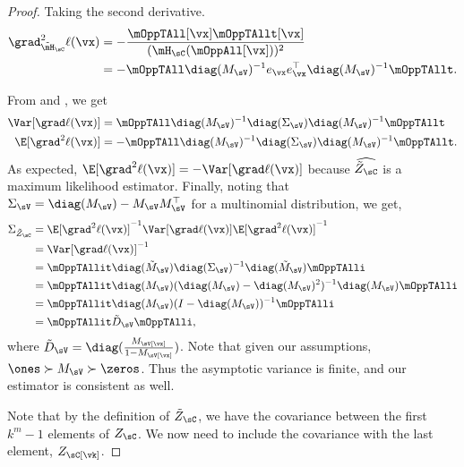 \begin{proof}
Taking the second derivative.
\begin{align}
  \grad^2_{\tilde \mH_\sC} \ell(\vx)
  &= - \frac{\mOppTAll[\vx] \mOppTAllt[\vx]}{(\mH_\sC(\mOppAll[\vx]))^2} \nonumber \\
  &= - \mOppTAll \diag(M_{\sV})^{-1} e_\vx e_\vx^\top  \diag(M_{\sV})^{-1} \mOppTAllt. \label{eqn:lhood-hess}%
\end{align}

From  and , we get
  \begin{align*}
    \Var [\grad \ell(\vx)] &= \mOppTAll \diag(M_\sV)^{-1} \diag(\Sigma_\sV) \diag(M_\sV)^{-1} \mOppTAllt \\
    \E[\grad^2 \ell(\vx)] &= -\mOppTAll \diag(M_\sV)^{-1} \diag(\Sigma_\sV) \diag(M_\sV)^{-1} \mOppTAllt.
  \end{align*}
As expected, $\E[\grad^2 \ell(\vx)] = -\Var [\grad \ell(\vx)]$ because $\widehat{\tilde Z_\sC}$ is a maximum likelihood estimator. 
Finally, noting that $\Sigma_\sV = \diag(M_\sV) - M_\sV M_\sV^\top$ for
  a multinomial distribution, we get,
\begin{align*}
    \Sigma_{\tilde Z_\sC} 
      &= \E[\grad^2 \ell(\vx)]^{-1} \Var [\grad \ell(\vx)] \E[\grad^2 \ell(\vx)]^{-1} \\
      &= \Var[\grad \ell(\vx)]^{-1} \\
      &= \mOppTAllit \diag(\tilde M_\sV) \diag(\Sigma_\sV)^{-1} \diag(\tilde M_\sV) \mOppTAlli \\
      &= \mOppTAllit \diag(M_\sV) (\diag(M_\sV) - \diag(M_\sV)^2)^{-1} \diag(M_\sV) \mOppTAlli \\
      &= \mOppTAllit \diag(M_\sV) (I - \diag(M_\sV))^{-1} \mOppTAlli \\
      &= \mOppTAllit \tilde D_\sV \mOppTAlli,
\end{align*}
where $\tilde D_\sV = \diag( \frac{M_\sV[\vx]}{1 - M_\sV[\vx]} )$.
Note that given our assumptions, $\ones \succ M_\sV \succ \zeros$. Thus
the asymptotic variance is finite, and our estimator is consistent as
well.

Note that by the definition of $\tilde Z_\sC$, we have the covariance
between the first $k^m - 1$ elements of $Z_\sC$. 
We now need to include the covariance with the last element,
  $Z_\sC[\vk]$. 


\end{proof}
